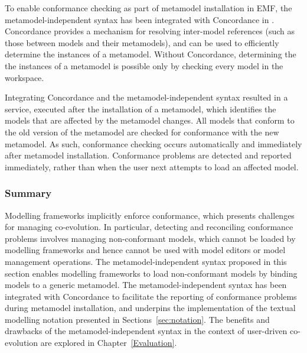 
To enable conformance checking as part of metamodel installation in EMF, the metamodel-independent syntax has been integrated with Concordance in \cite{rose10concordance}. Concordance provides a mechanism for resolving inter-model references (such as those between models and their metamodels), and can be used to efficiently determine the instances of a metamodel. Without Concordance, determining the the instances of a metamodel is possible only by checking every model in the workspace.

Integrating Concordance and the metamodel-independent syntax resulted in a service, executed after the installation of a metamodel, which identifies the models that are affected by the metamodel changes. All models that conform to the old version of the metamodel are checked for conformance with the new metamodel. As such, conformance checking occurs automatically and immediately after metamodel installation. Conformance problems are detected and reported immediately, rather than when the user next attempts to load an affected model.


\subsubsection{Summary}
Modelling frameworks implicitly enforce conformance, which presents challenges for managing co-evolution. In particular, detecting and reconciling conformance problems involves managing non-conformant models, which cannot be loaded by modelling frameworks and hence cannot be used with model editors or model management operations. The metamodel-independent syntax proposed in this section enables modelling frameworks to load non-conformant models by binding models to a generic metamodel. The metamodel-independent syntax has been integrated with Concordance \cite{rose10concordance} to facilitate the reporting of conformance problems during metamodel installation, and underpins the implementation of the textual modelling notation presented in Sections~\ref{sec:notation}. The benefits and drawbacks of the metamodel-independent syntax in the context of user-driven co-evolution are explored in Chapter~\ref{Evaluation}. 

